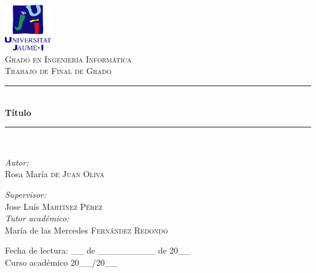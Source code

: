 \documentclass[pdftex,11pt,a4paper]{book}
\newcommand{\HRule}{\rule{\linewidth}{0.5mm}}
\begin{document}
\begin{titlepage}
\begin{center}

\includegraphics[width=0.15\textwidth]{logoUJI.jpg}~\\[2cm]

\textsc{\LARGE Grado en Ingeniería Informática}\\[1.5cm]

\textsc{\LARGE Trabajo de Final de Grado}\\[1.5cm]

\HRule \\[0.4cm]
{ \huge \bfseries Título \\[0.4cm] }

\HRule \\[1.5cm]

\begin{minipage}{0.4\textwidth}
\begin{flushleft} \large
\emph{Autor:}\\
Rosa María \textsc{de Juan Oliva}
\end{flushleft}
\end{minipage}
\begin{minipage}{0.4\textwidth}
\begin{flushright} \large
\emph{Supervisor:} \\
Jose Luís \textsc{Martínez Pérez} \\
\emph{Tutor académico:} \\
María de las Mercedes \textsc{Fernández Redondo}
\end{flushright}
\end{minipage}

\vfill

{\large Fecha de lectura: \_\_ de \_\_\_\_\_\_\_\_\_ de 20\_\_\\
Curso académico 20\_\_/20\_\_}

\end{center}
\end{titlepage}
\setlength{\parskip}{\baselineskip}
\end{document}
